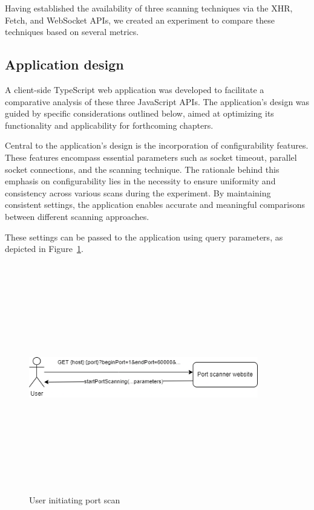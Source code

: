 Having established the availability of three scanning techniques via the XHR, Fetch, and WebSocket APIs, we created an experiment to compare these techniques based on several metrics.

\subsection{Application design}
\label{section:port-scanner-application}

A client-side TypeScript web application was developed to facilitate a comparative analysis of these three JavaScript APIs. The application's design was guided by specific considerations outlined below, aimed at optimizing its functionality and applicability for forthcoming chapters.

Central to the application's design is the incorporation of configurability features. These features encompass essential parameters such as socket timeout, parallel socket connections, and the scanning technique. The rationale behind this emphasis on configurability lies in the necessity to ensure uniformity and consistency across various scans during the experiment. By maintaining consistent settings, the application enables accurate and meaningful comparisons between different scanning approaches.

These settings can be passed to the application using query parameters, as depicted in Figure~\ref{fig:initiate-scan}. 

\begin{figure}[ht]
    \centering
\includegraphics[width=10cm, height=10cm, keepaspectratio]{port_scanning_techniques/img/initiate_port_scan.png}
    \caption{User initiating port scan}
    \label{fig:initiate-scan}
\end{figure}

